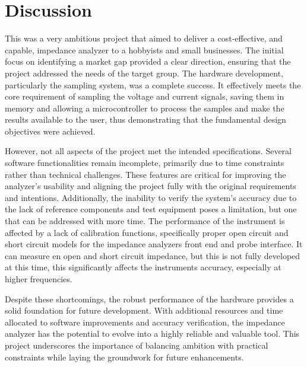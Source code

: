 \chapter{Discussion} \label{ch:Discussion}

This was a very ambitious project that aimed to deliver a cost-effective, and capable, impedance analyzer to a hobbyists and small businesses. The initial focus on identifying a market gap provided a clear direction, ensuring that the project addressed the needs of the target group. The hardware development, particularly the sampling system, was a complete success. It effectively meets the core requirement of sampling the voltage and current signals, saving them in memory and allowing a microcontroller to process the samples and make the results available to the user, thus demonstrating that the fundamental design objectives were achieved.

However, not all aspects of the project met the intended specifications. Several software functionalities remain incomplete, primarily due to time constraints rather than technical challenges. These features are critical for improving the analyzer's usability and aligning the project fully with the original requirements and intentions. Additionally, the inability to verify the system's accuracy due to the lack of reference components and test equipment poses a limitation, but one that can be addressed with more time. The performance of the instrument is affected by a lack of calibration functions, specifically proper open circuit and short circuit models for the impedance analyzers front end and probe interface. It can measure en open and short circuit impedance, but this is not fully developed at this time, this significantly affects the instruments accuracy, especially at higher frequencies.

Despite these shortcomings, the robust performance of the hardware provides a solid foundation for future development. With additional resources and time allocated to software improvements and accuracy verification, the impedance analyzer has the potential to evolve into a highly reliable and valuable tool. This project underscores the importance of balancing ambition with practical constraints while laying the groundwork for future enhancements.

